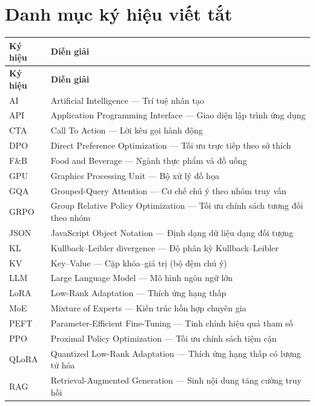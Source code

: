 \cleardoublepage
{}
{}
\chapter*{Danh mục ký hiệu viết tắt}

\begingroup
{}
\setlength{\parskip}{0pt}
\setlength{\LTpre}{0pt}
\setlength{\LTpost}{0pt}
\begin{longtable}{@{}p{2.6cm}p{\dimexpr\textwidth-3.1cm\relax}@{}}
\textbf{Ký hiệu} & \textbf{Diễn giải} \\[0.4em]
\endfirsthead
\textbf{Ký hiệu} & \textbf{Diễn giải} \\[0.4em]
\endhead
AI & Artificial Intelligence --- Trí tuệ nhân tạo \\
API & Application Programming Interface --- Giao diện lập trình ứng dụng \\
CTA & Call To Action --- Lời kêu gọi hành động \\
DPO & Direct Preference Optimization --- Tối ưu trực tiếp theo sở thích \\
F\&B & Food and Beverage --- Ngành thực phẩm và đồ uống \\
GPU & Graphics Processing Unit --- Bộ xử lý đồ họa \\
GQA & Grouped-Query Attention --- Cơ chế chú ý theo nhóm truy vấn \\
GRPO & Group Relative Policy Optimization --- Tối ưu chính sách tương đối theo nhóm \\
JSON & JavaScript Object Notation --- Định dạng dữ liệu dạng đối tượng \\
KL & Kullback--Leibler divergence --- Độ phân kỳ Kullback--Leibler \\
KV & Key--Value --- Cặp khóa--giá trị (bộ đệm chú ý) \\
LLM & Large Language Model --- Mô hình ngôn ngữ lớn \\
LoRA & Low-Rank Adaptation --- Thích ứng hạng thấp \\
MoE & Mixture of Experts --- Kiến trúc hỗn hợp chuyên gia \\
PEFT & Parameter-Efficient Fine-Tuning --- Tinh chỉnh hiệu quả tham số \\
PPO & Proximal Policy Optimization --- Tối ưu chính sách tiệm cận \\
QLoRA & Quantized Low-Rank Adaptation --- Thích ứng hạng thấp có lượng tử hóa \\
RAG & Retrieval-Augmented Generation --- Sinh nội dung tăng cường truy hồi \\

\end{longtable}
